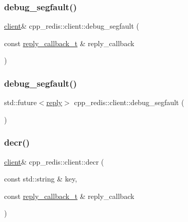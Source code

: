 \mbox{\label{classcpp__redis_1_1client_ac5d06ca1072ef1a83a8843c448e4d1e3}} 
\subsubsection{\texorpdfstring{debug\+\_\+segfault()}{debug\_segfault()}\hspace{0.1cm}{\footnotesize\ttfamily [1/2]}}
{\footnotesize\ttfamily \hyperlink{classcpp__redis_1_1client}{client}\& cpp\+\_\+redis\+::client\+::debug\+\_\+segfault (\begin{DoxyParamCaption}\item[{const \hyperlink{classcpp__redis_1_1client_a061a1140d36d2eaeda82b09a0bb3f9f2}{reply\+\_\+callback\+\_\+t} \&}]{reply\+\_\+callback }\end{DoxyParamCaption})}

\mbox{\label{classcpp__redis_1_1client_a764786e7003c538a6cf0a5d6b44d66dd}} 
\subsubsection{\texorpdfstring{debug\+\_\+segfault()}{debug\_segfault()}\hspace{0.1cm}{\footnotesize\ttfamily [2/2]}}
{\footnotesize\ttfamily std\+::future$<$\hyperlink{classcpp__redis_1_1reply}{reply}$>$ cpp\+\_\+redis\+::client\+::debug\+\_\+segfault (\begin{DoxyParamCaption}{ }\end{DoxyParamCaption})}

\mbox{\label{classcpp__redis_1_1client_a8e09d5753d9f9ba00b1d5e8aed306189}} 
\subsubsection{\texorpdfstring{decr()}{decr()}\hspace{0.1cm}{\footnotesize\ttfamily [1/2]}}
{\footnotesize\ttfamily \hyperlink{classcpp__redis_1_1client}{client}\& cpp\+\_\+redis\+::client\+::decr (\begin{DoxyParamCaption}\item[{const std\+::string \&}]{key,  }\item[{const \hyperlink{classcpp__redis_1_1client_a061a1140d36d2eaeda82b09a0bb3f9f2}{reply\+\_\+callback\+\_\+t} \&}]{reply\+\_\+callback }\end{DoxyParamCaption})}


